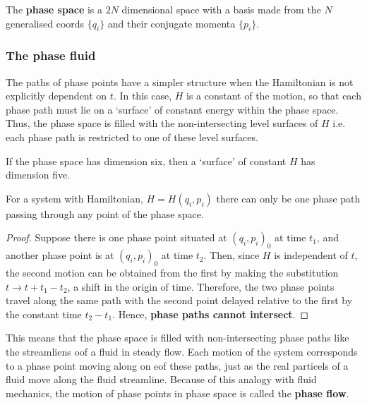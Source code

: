 \documentclass[12pt, a4paper]{article}
\begin{document}
\begin{definition}
    The \textbf{phase space} is a \(2N\) dimensional space with a basis made from the \(N\) generalised coords \(\{q_i\}\) and their conjugate momenta \(\{p_i\}\).
\end{definition}

\subsubsection{The phase fluid}

The paths of phase points have a simpler structure when the Hamiltonian is not explicitly dependent on \(t\). In this case, \(H\) is a constant of the motion, so that each phase path must lie on a `surface' of constant energy within the phase space. Thus, the phase space is filled with the non-intersecting level surfaces of \(H\) i.e. each phase path is restricted to one of these level surfaces.

\begin{mdnote}
    If the phase space has dimension six, then a `surface' of constant \(H\) has dimension five.
\end{mdnote}

\begin{mdthm}
    For a system with Hamiltonian, \(H = H(q_i,p_i)\) there can only be one phase path passing through any point of the phase space.
\end{mdthm}

\begin{proof}
    Suppose there is one phase point situated at \((q_i,p_i)_0\) at time \(t_1\), and another phase point is at \((q_i,p_i)_0\) at time \(t_2\). Then, since \(H\) is independent of \(t\), the second motion can be obtained from the first by making the substitution \(t \to t+t_1-t_2\), a shift in the origin of time. Therefore, the two phase points travel along the same path with the second point delayed relative to the first by the constant time \(t_2-t_1\). Hence, \textbf{phase paths cannot intersect}.
\end{proof}

This means that the phase space is filled with non-intersecting phase paths like the streamliens oof a fluid in steady flow. Each motion of the system corresponds to a phase point moving along on eof these paths, just as the real particels of a fluid move along the fluid streamline. Because of this analogy with fluid mechanics, the motion of phase points in phase space is called the \textbf{phase flow}.
\end{document}
